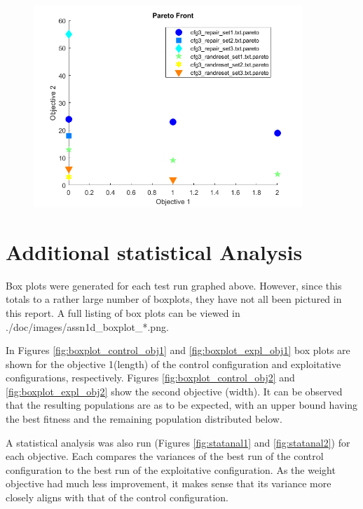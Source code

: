 \documentclass[11pt]{article}
\begin{document}
\begin{figure}[H]
	\centering
  \includegraphics[width=4in]{assn1d_cfg3_pareto.png}
  \label{fig:cfg3_pareto}
\end{figure}

\section{Additional statistical Analysis}\label{sect:statanal}

Box plots were generated for each test run graphed above. However, since this totals to a rather large number of boxplots, they have not all been pictured in this report. A full listing of box plots can be viewed in ./doc/images/assn1d\_boxplot\_*.png.

In Figures \ref{fig:boxplot_control_obj1} and \ref{fig:boxplot_expl_obj1} box plots are shown for the objective 1(length) of the control configuration and exploitative configurations, respectively. Figures \ref{fig:boxplot_control_obj2} and \ref{fig:boxplot_expl_obj2} show the second objective (width). It can be observed that the resulting populations are as to be expected, with an upper bound having the best fitness and the remaining population distributed below.

A statistical analysis was also run (Figures \ref{fig:statanal1} and \ref{fig:statanal2}) for each objective. Each compares the variances of the best run of the control configuration to the best run of the exploitative configuration. As the weight objective had much less improvement, it makes sense that its variance more closely aligns with that of the control configuration.
\end{document}
